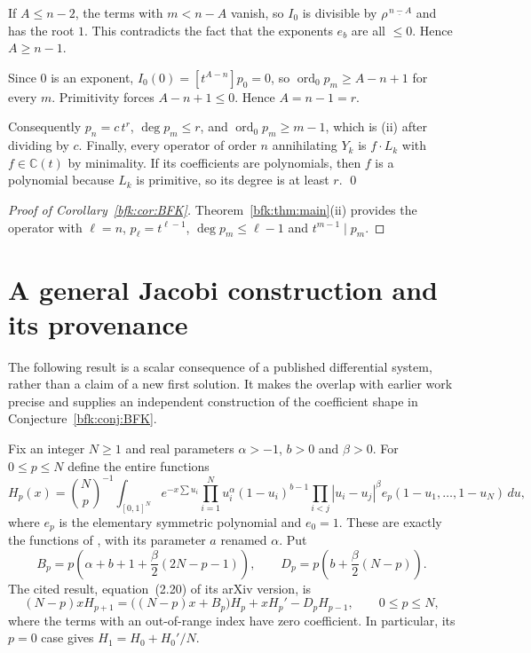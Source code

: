 \documentclass[11pt,a4paper]{article}
\theoremstyle{definition}
\theoremstyle{remark}
\numberwithin{equation}{section}
\newcommand{\C}{\mathbb{C}}
\newcommand{\ff}[2]{#1^{\underline{#2}}}
\DeclareMathOperator{\ord}{ord}
\begin{document}
If $A\le n-2$, the terms with $m<n-A$ vanish, so $I_0$ is divisible by $\ff\rho{\,n-A}$ and has the root $1$. This contradicts the fact that the exponents $e_b$ are all $\le0$. Hence $A\ge n-1$.

Since $0$ is an exponent, $I_0(0)=[t^{A-n}]p_0=0$, so $\ord_0p_m\ge A-n+1$ for every $m$. Primitivity forces $A-n+1\le0$. Hence $A=n-1=r$.

Consequently $p_n=c\,t^{r}$, $\deg p_m\le r$, and $\ord_0p_m\ge m-1$, which is (ii) after dividing by $c$. Finally, every operator of order $n$ annihilating $Y_k$ is $f\cdot L_k$ with $f\in\C(t)$ by minimality. If its coefficients are polynomials, then $f$ is a polynomial because $L_k$ is primitive, so its degree is at least $r$. \qed

\begin{proof}[Proof of Corollary~\ref{bfk:cor:BFK}]
Theorem~\ref{bfk:thm:main}(ii) provides the operator with $\ell=n$, $p_\ell=t^{\ell-1}$, $\deg p_m\le\ell-1$ and $t^{m-1}\mid p_m$.
\end{proof}


\section{A general Jacobi construction and its provenance}\label{bfk:sec:bfk-jacobi}
The following result is a scalar consequence of a published differential
system, rather than a claim of a new first solution. It makes the overlap
with earlier work precise and supplies an independent construction of the
coefficient shape in Conjecture~\ref{bfk:conj:BFK}.

Fix an integer $N\ge1$ and real parameters $\alpha>-1$, $b>0$ and $\beta>0$.
For $0\le p\le N$ define the entire functions
\begin{equation}\label{bfk:eq:bfk-Jacobi-H}
 H_p(x)=\binom Np^{-1}\int_{[0,1]^N}
 e^{-x\sum u_i}\prod_{i=1}^N u_i^\alpha(1-u_i)^{b-1}
 \prod_{i<j}|u_i-u_j|^\beta
 e_p(1-u_1,\ldots,1-u_N)\,du,
\end{equation}
where $e_p$ is the elementary symmetric polynomial and $e_0=1$.
These are exactly the functions of \cite[Corollary~2.5]{FK22}, with its
parameter $a$ renamed $\alpha$. Put
\[
 B_p=p\left(\alpha+b+1+\frac\beta2(2N-p-1)\right),\qquad
 D_p=p\left(b+\frac\beta2(N-p)\right).
\]
The cited result, equation~(2.20) of its arXiv version, is
\begin{equation}\label{bfk:eq:bfk-Jacobi-system}
 (N-p)xH_{p+1}=\bigl((N-p)x+B_p\bigr)H_p+xH_p'-D_pH_{p-1},
 \qquad 0\le p\le N,
\end{equation}
where the terms with an out-of-range index have zero coefficient.
In particular, its $p=0$ case gives $H_1=H_0+H_0'/N$.
\end{document}
